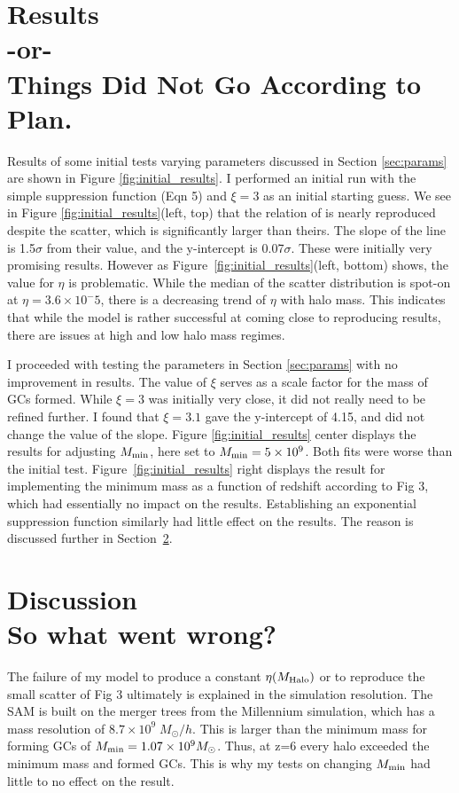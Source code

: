 \documentclass[onecolumn]{aastex62}
\begin{document}
\section{Results \\ -or- \\Things Did Not Go According to Plan.}
Results of some initial tests varying parameters discussed in Section \ref{sec:params} are shown in Figure \ref{fig:initial_results}. I performed an initial run with the simple suppression function (Eqn 5) and $\xi=3$ as an initial starting guess.  We see in Figure \ref{fig:initial_results}(left, top) that the relation of \cite{Spitler&Forbes2009} is nearly reproduced despite the scatter, which is significantly larger than theirs.  The slope of the line is 1.5$\sigma$ from their value, and the y-intercept is 0.07$\sigma$.  These were initially very promising results.  However as Figure~\ref{fig:initial_results}(left, bottom) shows, the value for $\eta$ is problematic.  While the median of the scatter distribution is spot-on at $\eta = 3.6 \times 10^-5$, there is a decreasing trend of $\eta$ with halo mass.  This indicates that while the model is rather successful at coming close to reproducing results, there are issues at high and low halo mass regimes.

I proceeded with testing the parameters in Section \ref{sec:params} with no improvement in results.  The value of $\xi$ serves as a scale factor for the mass of GCs formed.  While $\xi=3$ was initially very close, it did not really need to be refined further.  I found that  $\xi=3.1$ gave the y-intercept of 4.15, and did not change the value of the slope.  Figure \ref{fig:initial_results} center displays the results for adjusting $M_{\rm{min}}$, here set to $M_{\rm{min}} = 5\times10^9$.  Both fits were worse than the initial test.  Figure~\ref{fig:initial_results} right displays the result for implementing the minimum mass as a function of redshift according to  Fig 3, which had essentially no impact on the results.  Establishing an exponential suppression function similarly had little effect on the results.  The reason is discussed further in Section~\ref{sec:discussion}.  


\section{Discussion \\ So what went wrong?}\label{sec:discussion}
The failure of my model to produce a constant $\eta(M_{\rm{Halo}})$ or to reproduce the small scatter of \citealt{Spitler&Forbes2009} Fig 3 ultimately is explained in the simulation resolution.  The SAM is built on the merger trees from the Millennium simulation, which has a mass resolution of $8.7\times10^9 \; M_\odot/h$.  This is larger than the minimum mass for forming GCs of $M_{\rm{min}} = 1.07 \times 10^9 M_\odot$.  Thus, at z=6 every halo exceeded the minimum mass and formed GCs.  This is why my tests on changing $M_{\rm{min}}$ had little to no effect on the result.
\end{document}
